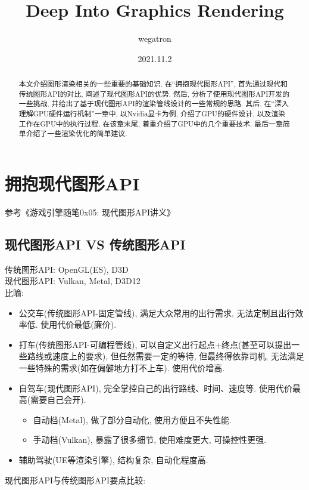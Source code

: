 \documentclass[UTF8]{ctexart}
\title{Deep Into Graphics Rendering}
\author{wegatron}
\date{2021.11.2}
\begin{document}
\maketitle

\begin{abstract}
	本文介绍图形渲染相关的一些重要的基础知识. 在“拥抱现代图形API”, 首先通过现代和传统图形API的对比, 阐述了现代图形API的优势. 然后, 分析了使用现代图形API开发的一些挑战, 并给出了基于现代图形API的渲染管线设计的一些常规的思路. 其后, 在“深入理解GPU硬件运行机制”一章中, 以Nvidia显卡为例, 介绍了GPU的硬件设计, 以及渲染工作在GPU中的执行过程. 在该章末尾, 着重介绍了GPU中的几个重要技术. 最后一章简单介绍了一些渲染优化的简单建议.
\end{abstract}

\section{拥抱现代图形API}
参考《游戏引擎随笔0x05: 现代图形API讲义》\cite{modernGraphicsAPI}
\subsection{现代图形API VS 传统图形API}
传统图形API: OpenGL(ES), D3D\\
现代图形API: Vulkan, Metal, D3D12\\
比喻:
\begin{itemize}
\item 公交车(传统图形API-固定管线), 满足大众常用的出行需求, 无法定制且出行效率低. 使用代价最低(廉价).
\item 打车(传统图形API-可编程管线), 可以自定义出行起点+终点(甚至可以提出一些路线或速度上的要求), 但任然需要一定的等待, 但最终得依靠司机, 无法满足一些特殊的需求(如在偏僻地方打不上车). 使用代价增高.
\item 自驾车(现代图形API), 完全掌控自己的出行路线、时间、速度等. 使用代价最高(需要自己会开).
  \begin{itemize}
  \item 自动档(Metal), 做了部分自动化, 使用方便且不失性能.
  \item 手动档(Vulkan), 暴露了很多细节, 使用难度更大, 可操控性更强.
  \end{itemize}
\item 辅助驾驶(UE等渲染引擎), 结构复杂, 自动化程度高.
\end{itemize}

现代图形API与传统图形API要点比较:
\end{document}
